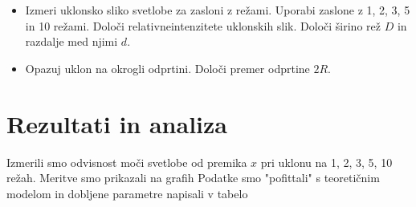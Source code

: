 \documentclass[12pt]{article}
\begin{document}
\begin{itemize}
    \item Izmeri uklonsko sliko svetlobe za zasloni z režami. Uporabi zaslone z 1, 2, 3, 5 in 10 režami. Določi relativneintenzitete uklonskih slik. Določi širino rež $D$ in razdalje med njimi $d$.
    \item Opazuj uklon na okrogli odprtini. Določi premer odprtine $2R$.
\end{itemize}
\newpage
\section{Rezultati in analiza}

Izmerili smo odvisnost moči svetlobe od premika $x$ pri uklonu na 1, 2, 3, 5, 10 režah. Meritve smo prikazali na grafih %
Podatke smo "pofittali" s teoretičnim modelom in dobljene parametre napisali v tabelo %
\end{document}
